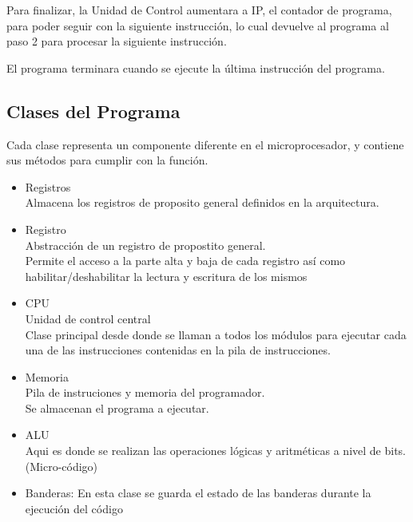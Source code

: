 \documentclass[conference]{IEEEtran}
\begin{document}
Para finalizar, la Unidad de Control aumentara
a IP, el contador de programa, para poder
seguir con la siguiente instrucción, lo cual
devuelve al programa al paso 2 para procesar la
siguiente instrucción.

 El programa terminara cuando se ejecute la
última instrucción del programa.
\subsection{Clases del Programa}
Cada clase representa un componente diferente en el
microprocesador, y contiene sus métodos para cumplir
con la función.

\begin{itemize}
    \item Registros\\
    Almacena los registros de proposito general definidos en la arquitectura.
    \item Registro\\
    Abstracción de un registro de propostito general.\\
    Permite el acceso a la parte alta y baja de cada registro así como habilitar/deshabilitar la lectura y escritura de los mismos 
    \item CPU\\
    Unidad de control central\\
    Clase principal desde donde se llaman a todos los módulos para ejecutar cada una de las 
    instrucciones contenidas en la pila de instrucciones. 
    \item  Memoria \\
    Pila de instruciones y memoria del programador.\\
    Se almacenan el programa a ejecutar. 
    \item ALU    \\
    Aqui es donde se realizan las operaciones lógicas y aritméticas a nivel de bits. (Micro-código) 
    \item Banderas: 
    En esta clase se guarda el estado de las banderas durante la ejecución del código 
\end{itemize}

\newpage
\end{document}
